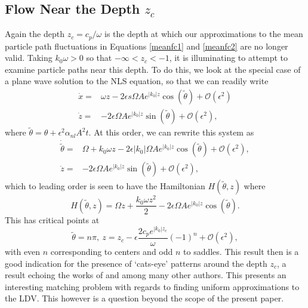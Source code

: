 \documentclass{JFM_Style/jfm}
\begin{document}
\subsection{Flow Near the Depth $z_{c}$}
Again the depth $z_{c}=c_{p}/\omega$ is the depth at which our approximations to the mean particle path fluctuations in Equations \eqref{meanfc1} and \eqref{meanfc2} are no longer valid.  Taking $k_{0}\omega >0$ so that $-\infty<z_{c}<-1$, it is illuminating to attempt to examine particle paths near this depth.  To do this, we look at the special case of a plane wave solution to the NLS equation, so that we can readily write
\begin{align*}
\dot{x} = & \omega z - 2\epsilon s\Omega A e^{|k_{0}|z}\cos(\tilde{\theta}) + \mathcal{O}(\epsilon^{2})\\
\dot{z} = & -2\epsilon\Omega A e^{|k_{0}|z}\sin(\tilde{\theta}) + \mathcal{O}(\epsilon^{2}),
\end{align*}
where $\tilde{\theta} = \theta + \epsilon^{2}\alpha_{nl}A^{2}t$.  At this order, we can rewrite this system as
\begin{align*}
\dot{\tilde{\theta}} = & \Omega+k_{0}\omega z - 2\epsilon |k_{0}|\Omega A e^{|k_{0}|z}\cos(\tilde{\theta}) + \mathcal{O}(\epsilon^{2}),\\
\dot{z} = & -2\epsilon\Omega A e^{|k_{0}|z}\sin(\tilde{\theta}) + \mathcal{O}(\epsilon^{2}),
\end{align*}
which to leading order is seen to have the Hamiltonian $H(\tilde{\theta},z)$ where
\[
H(\tilde{\theta},z) = \Omega z + \frac{k_{0}\omega z^{2}}{2} - 2\epsilon\Omega A e^{|k_{0}|z}\cos(\tilde{\theta}).
\]
This has critical points at
\[
\tilde{\theta}=n \pi, ~ z = z_{c} - \epsilon\frac{2c_{p} e^{|k_{0}|z_{c}}}{\omega} (-1)^{n} + \mathcal{O}(\epsilon^{2}),
\]
with even $n$ corresponding to centers and odd $n$ to saddles.  This result then is a good indication for the presence of `cats-eye' patterns around the depth $z_{c}$, a result echoing the works of \cite{simmen,dasilva,wahlen2} and \cite{nachbin} among many other authors.  This presents an interesting matching problem with regards to finding uniform approximations to the LDV.  This however is a question beyond the scope of the present paper.
\end{document}
